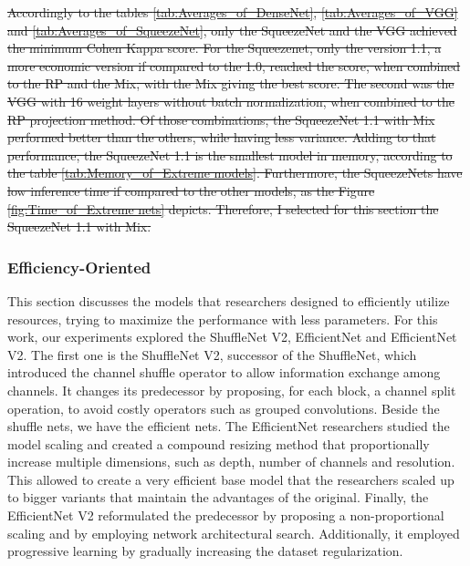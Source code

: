 \sout{
Accordingly to the tables \ref{tab:Averages_of_DenseNet}, \ref{tab:Averages_of_VGG} and \ref{tab:Averages_of_SqueezeNet}, only the SqueezeNet and the VGG achieved the minimum Cohen Kappa score. For the Squeezenet, only the version 1.1, a more economic version if compared to the 1.0, reached the score, when combined to the \gls{RP} and the \gls{Mix}, with the \gls{Mix} giving the best score. The second was the VGG with 16 weight layers without batch normalization, when combined to the \gls{RP} projection method. Of those combinations, the SqueezeNet 1.1 with \gls{Mix} performed better than the others, while having less variance. Adding to that performance, the SqueezeNet 1.1 is the smallest model in memory, according to the table \ref{tab:Memory_of_Extreme models}. Furthermore, the SqueezeNets have low inference time if compared to the other models, as the Figure \ref{fig:Time_of_Extreme nets} depicts. Therefore, I selected for this section the SqueezeNet 1.1 with \gls{Mix}.
}






\FloatBarrier

\subsubsection{Efficiency-Oriented}

This section discusses the models that researchers designed to efficiently utilize resources, trying to maximize the performance with less parameters. For this work, our experiments explored the ShuffleNet V2, EfficientNet and EfficientNet V2. The first one is the ShuffleNet V2, successor of the ShuffleNet, which introduced the channel shuffle operator to allow information exchange among channels. It changes its predecessor by proposing, for each block, a channel split operation, to avoid costly operators such as grouped convolutions. Beside the shuffle nets, we have the efficient nets. The EfficientNet researchers studied the model scaling and created a compound resizing method that proportionally increase multiple dimensions, such as depth, number of channels and resolution. This allowed to create a very efficient base model that the researchers scaled up to bigger variants that maintain the advantages of the original. Finally, the EfficientNet V2 reformulated the predecessor by proposing a non-proportional scaling and by employing network architectural search. Additionally, it employed progressive learning by gradually increasing the dataset regularization.  

